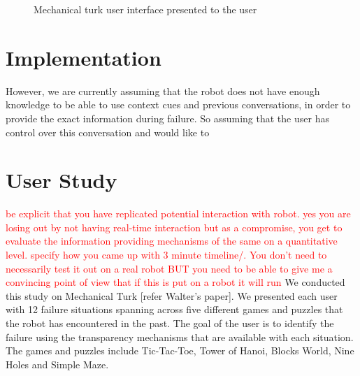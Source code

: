 \documentclass[letterpaper]{article}
\begin{document}
\begin{figure}[ht!]
\centering
{}
\caption{Mechanical turk user interface presented to the user}
\label{fig:user-interface}
\end{figure}

\section{Implementation}
However, we are currently assuming that the robot does not have enough knowledge to be able to use context cues and previous conversations, in order to provide the exact information during failure. So assuming that the user has control over this conversation and would like to 
\section{User Study}
\textcolor{red}{be explicit that you have replicated potential interaction with robot. yes you are losing out by not having real-time interaction but as a compromise, you get to evaluate the information providing mechanisms of the same on a quantitative level. specify how you came up with 3 minute timeline/. You don't need to necessarily test it out on a real robot BUT you need to be able to give me a convincing point of view that if this is put on a robot it will run}
We conducted this study on Mechanical Turk [refer Walter's paper]. We presented each user with 12 failure situations spanning across five different games and puzzles that the robot has encountered in the past. The goal of the user is to identify the failure using the transparency mechanisms that are available with each situation. The games and puzzles include Tic-Tac-Toe, Tower of Hanoi, Blocks World, Nine Holes and Simple Maze. 
\end{document}
